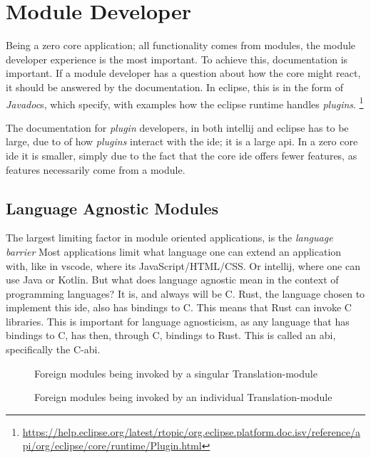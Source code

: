 \section{Module Developer}

Being a zero core application; all functionality comes from modules, the module
developer experience is the most important. To achieve this, documentation is
important. If a module developer has a question about how the core might react,
it should be answered by the documentation. In \gls*{eclipse}, this is in the
form of \textit{Javadoc}s, which specify, with examples how the \gls*{eclipse}
runtime handles \textit{plugins}. \footnote{\url{https://help.eclipse.org/latest/rtopic/org.eclipse.platform.doc.isv/reference/api/org/eclipse/core/runtime/Plugin.html}}

The documentation for \textit{plugin} developers, in both \gls*{intellij} and
\gls*{eclipse} has to be large, due to of how \textit{plugins} interact with the
\gls*{ide}; it is a large \gls*{api}. In a zero core \gls*{ide} it is smaller,
simply due to the fact that the core \gls*{ide} offers fewer features, as features
necessarily come from a module.

\subsection{Language Agnostic Modules}

The largest limiting factor in module oriented applications, is the
\textit{language barrier} Most applications limit what language one can extend
an application with, like in \gls*{vscode}, where its JavaScript/HTML/CSS. Or
\gls*{intellij}, where one can use Java or Kotlin. But what does language agnostic
mean in the context of programming languages? It is, and always will be C. Rust,
the language chosen to implement this \gls*{ide}, also has bindings to C. This
means that Rust can invoke C libraries. This is important for language
agnosticism, as any language that has bindings to C, has then, through C,
bindings to Rust. This is called an \gls*{abi}, specifically the C-\gls*{abi}.

\begin{figure}
  \begin{center}
    
    \caption{Foreign modules being invoked by a singular Translation-module}
    \label{fig:fm1}
  \end{center}
\end{figure}

\begin{figure}
  \begin{center}
    
    \caption{Foreign modules being invoked by an individual Translation-module}
    \label{fig:fm2}
  \end{center}
\end{figure}

